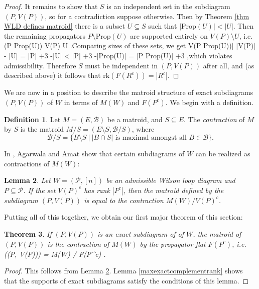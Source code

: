 \documentclass[11pt]{article}
\newcommand{\rk}{\textrm{rk} }
\def\bas #1\eas{\begin{align*} #1 \end{align*}}
\newcommand{\cP}{\mathcal{P}}
\newcommand{\cB}{\mathcal{B}}
\newcommand{\Prop}{\textrm{Prop}}
\newtheorem{thm}{Theorem}[section]
\newtheorem{lem}[thm]{Lemma}
\theoremstyle{remark}
\theoremstyle{definition}
\newtheorem{dfn}[thm]{Definition}
\begin{document}
\begin{proof}
It remains to show that $S$ is an independent set in the subdiagram $(P, V(P))$, so for a contradiction suppose otherwise. Then by Theorem \ref{thm WLD defines matroid} there is a subset $U \subseteq S$ such that $|\Prop(U)| < |U|$. Then the remaining propagators $P \setminus \Prop(U)$ are supported entirely on $V(P) \setminus U$, i.e. \bas  V(P \setminus \Prop(U)) \subseteq V(P) \setminus U\; .\eas Comparing sizes of these sets, we get \bas |V(P \setminus \Prop(U))| \leq |V(P)| - |U| = |P| +3 -|U| < |P| +3 -|\Prop(U)| = |P \setminus \Prop(U)| +3\; ,\eas which violates admissibility. Therefore $S$ must be independent in $(P, V(P))$ after all, and (as described above) it follows that $\rk(F(R^c)) = |R^c|$.

\end{proof}

We are now in a position to describe the matroid structure of exact subdiagrams $(P, V(P))$ of $W$ in terms of $M(W)$ and $F(P^c)$. We begin with a definition.

\begin{dfn}\label{matroid contraction}
Let $M = (E,\cB)$ be a matroid, and $S \subseteq E$. The {\em contraction} of $M$ by $S$ is the matroid $M/S = (E \setminus S, \cB / S)$, where
\[\cB / S = \{B \setminus S \ \big| \ |B\cap S | \text{ is maximal amongst all }B \in \cB\}.\]
\end{dfn}

In \cite{wilsonloop}, Agarwala and Amat show that certain subdiagrams of $W$ can be realized as contractions of $M(W)$:

\begin{lem} \label{contractsubdiaglem} \cite[Theorem 3.33]{wilsonloop} 
Let $W = (\cP, [n])$ be an admissible Wilson loop diagram and $P \subseteq \cP$. If the set $V(P)^c$ has rank $|P^c|$, then the matroid defined by the subdiagram $(P, V(P))$ is equal to the contraction $M(W)/V(P)^c$.
\end{lem}

Putting all of this together, we obtain our first major theorem of this section:

\begin{thm} \label{exact diagrams contractions}
If $(P, V(P))$ is an exact subdiagram of of $W$, the matroid of $(P,V(P))$ is the contraction of $M(W)$ by the propagator flat $F(P^c)$, i.e. \bas M\big((P, V(P))\big) = M(W)  / F(P^c) \;.\eas 
\end{thm}

\begin{proof}
This follows from Lemma \ref{contractsubdiaglem}. Lemma \ref{maxexactcomplementrank} shows that the supports of exact subdiagrams satisfy the conditions of this lemma.
\end{proof}
\end{document}
